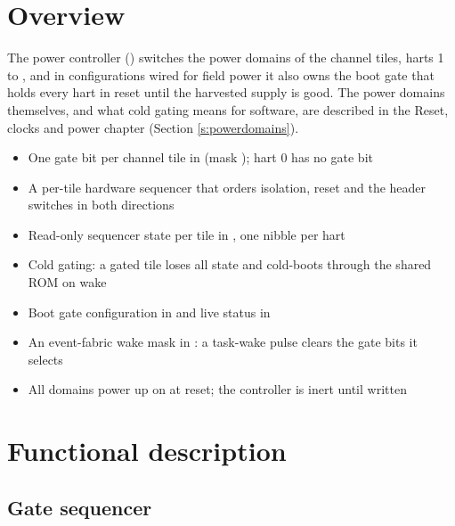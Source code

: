 \section{Overview}

The power controller () switches the power domains of the channel tiles, harts 1 to \MaxHartIndex{}, and in configurations wired for field power it also owns the boot gate that holds every hart in reset until the harvested supply is good. The power domains themselves, and what cold gating means for software, are described in the Reset, clocks and power chapter (Section \ref{s:powerdomains}).

\begin{itemize}
	\item One gate bit per channel tile in  (mask \texttt{\PwrGateMask}); hart 0 has no gate bit
	\item A per-tile hardware sequencer that orders isolation, reset and the header switches in both directions
	\item Read-only sequencer state per tile in , one nibble per hart
	\item Cold gating: a gated tile loses all state and cold-boots through the shared ROM on wake
	\item Boot gate configuration in  and live status in 
	\item An event-fabric wake mask in : a task-wake pulse clears the  gate bits it selects
	\item All domains power up on at reset; the controller is inert until written
\end{itemize}

\section{Functional description}

\subsection{Gate sequencer}

